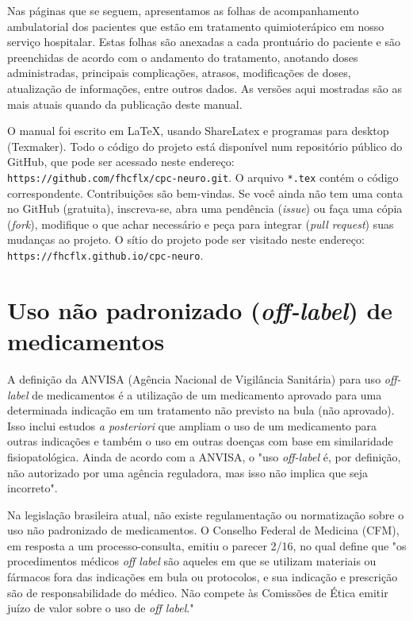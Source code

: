 \documentclass[11pt,a4paper,oldfontcommands]{memoir}
\begin{document}
Nas páginas que se seguem, apresentamos as folhas de acompanhamento ambulatorial dos pacientes que estão em tratamento quimioterápico em nosso serviço hospitalar. Estas folhas são anexadas a cada prontuário do paciente e são preenchidas de acordo com o andamento do tratamento, anotando doses administradas, principais complicações, atrasos, modificações de doses, atualização de informações, entre outros dados. As versões aqui mostradas são as mais atuais quando da publicação deste manual.

O manual foi escrito em LaTeX, usando ShareLatex e programas para desktop (Texmaker). Todo o código do projeto está disponível num repositório público do GitHub, que pode ser acessado neste endereço: \texttt{https://github.com/fhcflx/cpc-neuro.git}. O arquivo \texttt{*.tex} contém o código correspondente. Contribuições são bem-vindas. Se você ainda não tem uma conta no GitHub (gratuita), inscreva-se, abra uma pendência (\textit{issue}) ou faça uma cópia (\textit{fork}), modifique o que achar necessário e peça para integrar (\textit{pull request}) suas mudanças ao projeto. O sítio do projeto pode ser visitado neste endereço: \texttt{https://fhcflx.github.io/cpc-neuro}. 

\section{Uso não padronizado (\textit{off-label}) de medicamentos}

A definição da ANVISA (Agência Nacional de Vigilância Sanitária) para uso \textit{off-label} de medicamentos é a utilização de um medicamento aprovado para uma determinada indicação em um tratamento não previsto na bula (não aprovado). Isso inclui estudos \textit{a posteriori} que ampliam o uso de um medicamento para outras indicações e também o uso em outras doenças com base em similaridade fisiopatológica. Ainda de acordo com a ANVISA, o "uso \textit{off-label} é, por definição, não autorizado por uma agência reguladora, mas isso não implica que seja incorreto".

Na legislação brasileira atual, não existe regulamentação ou normatização sobre o uso não padronizado de medicamentos. O Conselho Federal de Medicina (CFM), em resposta a um processo-consulta, emitiu o parecer 2/16, no qual define que "os procedimentos médicos \textit{off label} são aqueles em que se utilizam materiais ou fármacos fora das indicações em bula ou protocolos, e sua indicação e prescrição são de responsabilidade do médico. Não compete às Comissões de Ética emitir juízo de valor sobre o uso de \textit{off label}." \cite{cfm}
\end{document}
